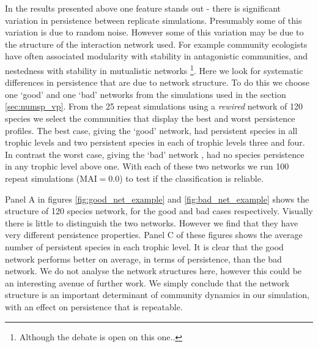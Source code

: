 In the results presented above one feature stands out - there is significant variation in persistence between replicate simulations. Presumably some of this variation is due to random noise. However some of this variation may be due to the structure of the interaction network used. For example community ecologists have  often associated modularity with stability in antagonistic communities, and nestedness with stability in mutualistic networks \cite{sauve2014structure}\footnote{Although the debate is open on this one..}. Here we look for systematic differences in persistence that are due to network structure. To do this we choose one `good' and one `bad' networks from the simulations used in the section \ref{sec:numsp_vp}. From the 25 repeat simulations using a \emph{rewired} network of 120 species we select the communities that display the best and worst persistence profiles. The best case, giving the `good' network, had persistent species in all trophic levels and two persistent species in each of trophic levels three and four. In contrast the worst case, giving the `bad' network   , had no species persistence in any trophic level above one. With each of these two networks we run 100 repeat simulations (MAI$=0.0$) to test if the classification is reliable.  

Panel A in figures \ref{fig:good_net_example} and \ref{fig:bad_net_example} shows the structure of 120 species network, for the good and bad cases respectively. Visually there is little to distinguish the two networks. However we find that they have very different persistence properties. Panel C of these figures shows the average number of persistent species in each trophic level. It is clear that the good network performs better on average, in terms of persistence, than the bad network. We do not analyse the network structures here, however this could be an interesting avenue of further work. We simply conclude that the network structure is an important determinant of community dynamics in our simulation, with an effect on persistence that is repeatable.  

%	
%	
%
%
%
%	
%


